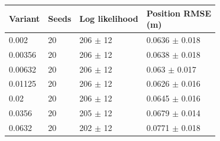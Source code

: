 \begin{tabular}{llll}
\toprule
Variant & Seeds & Log likelihood & \shortstack[l]{Position RMSE\\(m)} \\
\midrule
0.002 & 20 & 206 $\pm$ 12 & 0.0636 $\pm$ 0.018 \\
0.00356 & 20 & 206 $\pm$ 12 & 0.0638 $\pm$ 0.018 \\
0.00632 & 20 & 206 $\pm$ 12 & 0.063 $\pm$ 0.017 \\
0.01125 & 20 & 206 $\pm$ 12 & 0.0626 $\pm$ 0.016 \\
0.02 & 20 & 206 $\pm$ 12 & 0.0645 $\pm$ 0.016 \\
0.0356 & 20 & 205 $\pm$ 12 & 0.0679 $\pm$ 0.014 \\
0.0632 & 20 & 202 $\pm$ 12 & 0.0771 $\pm$ 0.018 \\
\bottomrule
\end{tabular}
